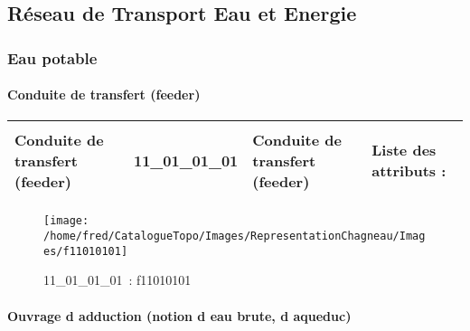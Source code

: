 \documentclass[12pt,titlepage]{book}
\begin{document}
\subsection{Réseau de Transport Eau et Energie}
\subsubsection{\large Eau potable}
\paragraph{Conduite de transfert (feeder)}
\noindent
\vspace{\baselineskip}

\renewcommand{\arraystretch}{1.2}
\begin{supertabular}{|p{10cm}|c|p{13cm}|p{12cm}|}
 Conduite de transfert (feeder) & 11\_01\_01\_01 & Conduite de transfert (feeder) & Liste des attributs :
\begin{enumerate}
\end{enumerate}
\\
\hline
\end{supertabular}
\begin{figure}[h!]
  \hfill         %
  \begin{minipage}[t]{3cm}
    \begin{center}
      \texttt{[image: /home/fred/CatalogueTopo/Images/RepresentationChagneau/Images/f11010101]}
      \caption[~11\_01\_01\_01]{\small{11\_01\_01\_01~:} \tiny{f11010101}}\label{f11010101}
    \end{center}
  \end{minipage}
\end{figure}


\paragraph{Ouvrage d adduction (notion d eau brute, d aqueduc)}
\noindent
\vspace{\baselineskip}
\end{document}
